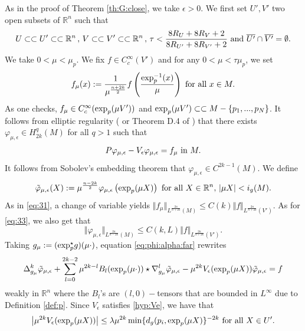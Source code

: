 \documentclass[reqno]{amsart}
\def \rn {\mathbb{R}^n}
\def \eps {\epsilon}
\begin{document}
 As in the proof of Theorem \ref{th:G:close}, we take $\eps>0$. We first set $U',V'$ two open subsets of $\rn$ such that
\begin{equation*}
U\subset\subset U'\subset\subset \rn \, ,\, V\subset\subset V'\subset\subset \rn\, ,\, \tau<\frac{8R_U+8R_V+2}{8R_{U'}+8R_{V'}+2} \hbox{ and }\overline{U'}\cap\overline{V'}=\emptyset.
\end{equation*}
We take $0<\mu<\mu_p$. We fix $f\in C^\infty_c(V')$ and for any $0<\mu<\tau\mu_p$, we set 
$$f_\mu(x):=\frac{1}{\mu^{\frac{n+2k}{2}}}f\left(\frac{\hbox{exp}_{p}^{-1}(x)}{\mu}\right)\hbox{ for all }x\in M.$$
As one checks, $f_\mu\in C^\infty_c(\hbox{exp}_{p}(\mu V'))$ and $\hbox{exp}_{p}(\mu V')\subset\subset M-\{p_1,...,p_N\}$. It follows from elliptic regularity (\cite{ADN} or Theorem D.4 of \cite{robert:gjms}) that there exists $\varphi_{\mu,\eps}\in H_{2k}^q(M)$ for all $q>1$ such that
\begin{equation}\label{eq:phi:alpha:far}
P\varphi_{\mu,\eps}-V_\eps\varphi_{\mu,\eps}=f_\mu\hbox{ in }M.
\end{equation}
It follows from Sobolev's embedding theorem that $\varphi_{\mu,\eps}\in C^{2k-1}(M)$. We define
\begin{equation}\label{def:tilde:phi:far}
\tilde{\varphi}_{\mu,\eps}(X):= \mu^{\frac{n-2k}{2}}\varphi_{\mu,\eps}\left(\hbox{exp}_{p}(\mu X)\right)\hbox{ for all }X\in \rn,\, |\mu X|<i_g(M).
\end{equation}
As in \eqref{eq:31}, a change of variable yields $\Vert f_\mu\Vert_{L^{\frac{2n}{n+2k}}(M)}\leq C(k)\Vert f\Vert_{L^{\frac{2n}{n+2k}}(V')}$. As for \eqref{eq:33}, we also get that
\begin{equation}\label{eq:33:far}
\Vert \varphi_{\mu,\eps}\Vert_{L^{\frac{2n}{n-2k}}(M)}\leq C(k,L) \Vert f\Vert_{L^{\frac{2n}{n+2k}}(V')}. 
\end{equation}
Taking $g_\mu:=(\hbox{exp}_{p}^\star g)(\mu\cdot)$, equation \eqref{eq:phi:alpha:far} rewrites
\begin{equation*}
\Delta_{g_\mu}^k\tilde{\varphi}_{\mu,\eps}+\sum_{l=0}^{2k-2}\mu^{2k-l}B_l(\hbox{exp}_{p}(\mu \cdot))\star\nabla_{g_\mu}^l\tilde{\varphi}_{\mu,\eps}-\mu^{2k}V_\eps(\hbox{exp}_{p}(\mu X))\tilde{\varphi}_{\mu,\eps}=f
\end{equation*}
weakly in $\rn$ where the $B_l$'s are $(l,0)-$tensors that are bounded in $L^\infty$ due to Definition \ref{def:p}. Since $V_\eps$ satisfies \eqref{hyp:Ve}, we have that
\begin{equation*}
\left|\mu^{2k}V_\eps(\hbox{exp}_{p}(\mu X))\right|\leq \lambda \mu^{2k}\min\{d_g(p_i,\hbox{exp}_{p}(\mu X) \}^{-2k}\hbox{ for all }X\in U'.
\end{equation*}
\end{document}
